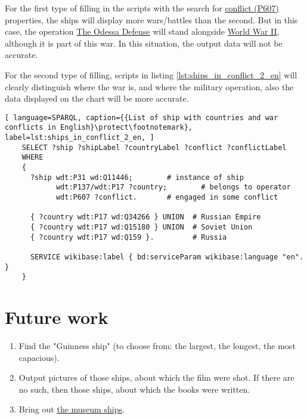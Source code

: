 For the first type of filling in the scripts with the search for \href{https://www.wikidata.org/wiki/Property:P607}{conflict (P607)} properties, the ships will display more wars/battles than the second. But in this case, the operation \href{https://en.wikipedia.org/wiki/Siege_of_Odessa_(1941)}{The Odessa Defense} will stand alongside \href{https://en.wikipedia.org/wiki/World_War_II}{World War II}, although it is part of this war. In this situation, the output data will not be accurate.

For the second type of filling, scripts in listing \ref{lst:ships_in_conflict_2_en} will clearly distinguish where the war is, and where the military operation, also the data displayed on the chart will be more accurate.

\begin{lstlisting}[ language=SPARQL, caption={{List of ship with countries and war conflicts in English}\protect\footnotemark}, label=lst:ships_in_conflict_2_en, ]
    SELECT ?ship ?shipLabel ?countryLabel ?conflict ?conflictLabel
    WHERE
    {
      ?ship wdt:P31 wd:Q11446;        # instance of ship
            wdt:P137/wdt:P17 ?country;        # belongs to operator
            wdt:P607 ?conflict.       # engaged in some conflict
      
      { ?country wdt:P17 wd:Q34266 } UNION  # Russian Empire
      { ?country wdt:P17 wd:Q15180 } UNION  # Soviet Union
      { ?country wdt:P17 wd:Q159 }.         # Russia
      
      SERVICE wikibase:label { bd:serviceParam wikibase:language "en". }
    }
\end{lstlisting}


\section{Future work}

\begin{enumerate}
  \item Find the "Guinness ship" (to choose from: the largest, the longest, the most capacious).
  \item Output pictures of those ships, about which the film were shot. If there are no such, then those ships, about which the books were written.
  \item Bring out \href{https://en.wikipedia.org/wiki/List_of_museum_ships}{the museum ships}.
\end{enumerate}


